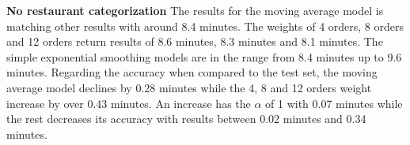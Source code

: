 \begin{table}[h]
\centering
\caption{Weekday categorization with slots}
\label{Weekday and slot categorization results}
\end{table}
\newline\newline\textbf{No restaurant categorization}\newline
The results for the moving average model is matching other results with around 8.4 minutes. The weights of 4 orders, 8 orders and 12 orders return results of 8.6 minutes, 8.3 minutes and 8.1 minutes. The simple exponential smoothing models are in the range from 8.4 minutes up to 9.6 minutes. Regarding the accuracy when compared to the test set, the moving average model declines by 0.28 minutes while the 4, 8 and 12 orders weight increase by over 0.43 minutes. An increase has the $\alpha$ of 1 with 0.07 minutes while the rest decreases its accuracy with results between 0.02 minutes and 0.34 minutes.\newline
